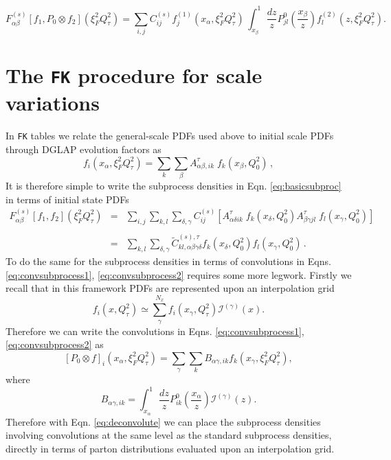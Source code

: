 \documentclass[11pt]{article}
\newcommand{\be}{\begin{equation}}
\newcommand{\ee}{\end{equation}}
\begin{document}
\be \label{eq:convsubprocess2} F^{(s)}_{\alpha\beta}[f_1, P_0\otimes f_2](\xi_F^2{Q^2_\tau})=\sum_{i,j} C^{(s)}_{ij} 
 f_j^{(1)}(x_{\alpha},\xi_F^2Q^2_\tau)\,  \int_{x_\beta}^1 \frac{dz}{z}P^0_{jl}\left(\frac{x_\beta}{z}\right)f^{(2)}_l(z,\xi_F^2Q^2_\tau). \ee
\section{The {\tt FK} procedure for scale variations}
In {\tt FK} tables we relate the general-scale PDFs used above to initial scale PDFs through DGLAP evolution factors as
\begin{equation}\label{eq:fastPDFfinal_recalled}
  f_i(x_{\alpha},\xi_F^2Q^2_\tau) = \sum_{k}
  \sum_\beta A^\tau_{\alpha\beta, ik}\;
  f_k(x_\beta,Q^2_0)\,, 
\end{equation}
It is therefore simple to write the subprocess densities in Eqn. \ref{eq:basicsubproc} in terms of initial state PDFs
\begin{equation}\label{eq:FK1}
\begin{array}{rcl}
F^{(s)}_{\alpha\beta}[f_1, f_2](\xi_F^2Q^2_\tau) &=&  \displaystyle \sum_{i,j} \sum_{k,l}
                               \sum_{\delta,\gamma} C^{(s)}_{ij}
                               \left[  A^\tau_{\alpha\delta ik}\;
                               f_k(x_\delta,Q^2_0) A^\tau_{\beta\gamma
                               jl}\; f_l(x_\gamma,Q^2_0) \right]\;\;\;
  \\
\\
&=& \displaystyle \sum_{k,l}\sum_{\delta,\gamma}
\widetilde{C}^{(s),\tau}_{kl,\alpha\beta\gamma\delta}
f_k(x_\delta,Q^2_0) f_l(x_\gamma,Q^2_0)\,.
\end{array}
\end{equation}
To do the same for the subprocess densities in terms of convolutions in Eqns. \ref{eq:convsubprocess1}, \ref{eq:convsubprocess2} requires some more legwork.
Firstly we recall that in this framework PDFs are represented upon an interpolation grid
\be f_i(x,Q_\tau^2) \simeq \sum_\gamma^{N_x} f_i(x_\gamma, Q_\tau^2)\mathcal{I}^{(\gamma)}(x).\ee
Therefore we can write the convolutions in Eqns. \ref{eq:convsubprocess1}, \ref{eq:convsubprocess2} as
\be \label{eq:deconvolute} \left[P_0\otimes f\right]_{i}(x_\alpha,  \xi_F^2Q_\tau^2) = \sum_\gamma \sum_k B_{\alpha\gamma, ik} f_k(x_\gamma, \xi_F^2Q_\tau^2),\ee
where
\be B_{\alpha\gamma, ik} = \int_{x_\alpha}^1 \frac{dz}{z} P_{ik}^0\left(\frac{x_\alpha}{z}\right)\mathcal{I}^{(\gamma)}(z).\ee
Therefore with Eqn. \ref{eq:deconvolute} we can place the subprocess densities involving convolutions at the same level as the standard subprocess densities, directly in terms of parton distributions evaluated upon an interpolation grid.
\end{document}
